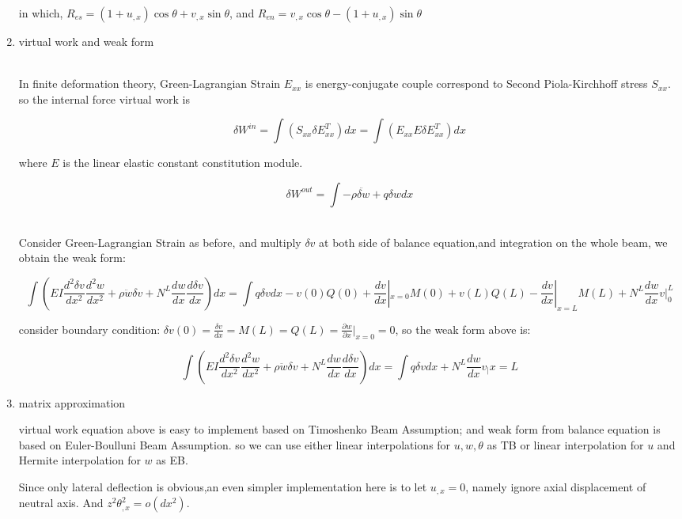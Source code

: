 \documentclass[11pt]{article}
\begin{document}
\begin{enumerate}
in which, $ R_{es} = (1 + u_{,x}) \cos \theta + v_{,x} \sin \theta $, and $R_{en} = v_{,x} \cos \theta - ( 1 + u_{,x}) \sin \theta$

\item{virtual work and weak form}

 \\
In finite deformation theory, Green-Lagrangian Strain $E_{xx}$ is energy-conjugate couple correspond to Second Piola-Kirchhoff stress $S_{xx}$. so the internal force virtual work is

$$ \delta W^{in} = \int (S_{xx} \delta E_{xx}^T) dx =  \int (E_{xx} E \delta E_{xx}^T) dx $$

where $E$ is the linear elastic constant constitution module. 

$$ \delta W^{out} = \int -\rho \ddot{\delta w} + q \delta w dx $$

\\

Consider Green-Lagrangian Strain as before, and multiply $\delta v$ at both side of balance equation,and integration on the whole beam, we obtain the weak form:

$$ \int ( EI \frac{d^2 \delta v}{dx^2} \frac{d^2 w}{dx^2} + \rho \ddot{w} \delta v + N^L \frac{d w}{dx} \frac{d \delta v}{dx}) dx = \int q \delta v dx - v(0)Q(0) + \frac{dv}{dx}|_{x=0} M(0) + v(L)Q(L) - \frac{dv}{dx}|_{x=L}M(L) + N^L \frac{dw}{dx}v|^L_0 $$

consider boundary condition:
$ \delta v(0) = \frac{\delta v}{dx} = M(L) = Q(L) = \frac{\partial w}{\partial x}|_{x=0} = 0 $, so the weak form above is:

$$ \int ( EI \frac{d^2 \delta v}{dx^2} \frac{d^2 w}{dx^2} + \rho \ddot{w} \delta v + N^L \frac{d w}{dx} \frac{d \delta v}{dx}) dx = \int q \delta v dx + N^L \frac{dw}{dx}v _ | {x=L} $$

\item{matrix approximation}

virtual work equation above is easy to implement based on Timoshenko Beam Assumption; and weak form from balance equation is based on Euler-Boulluni Beam Assumption. so we can use either linear interpolations for $u, w, \theta$ as TB or linear interpolation for $u$ and Hermite interpolation for $w$ as EB.

Since only lateral deflection is obvious,an even simpler implementation here is to let $ u_{,x} = 0 $, namely ignore axial displacement of neutral axis.  And $ z^2 \theta_{,x} ^2 = o(dx^2)$.



\end{enumerate}
\end{document}
